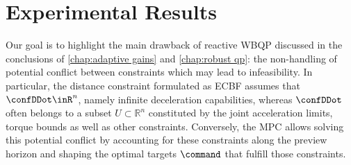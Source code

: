 \section{Experimental Results}\label{sec-chap5:experiments}
Our goal is to highlight the main drawback of reactive WBQP discussed in the conclusions of \cref{chap:adaptive gains} and \cref{chap:robust qp}: the non-handling of potential conflict between constraints which may lead to infeasibility. In particular, the distance constraint formulated as ECBF assumes that $\confDDot\inR^n$, namely infinite deceleration capabilities, whereas $\confDDot$  often belongs to a subset  $U\subset\mathbb{R}^n$ constituted by the joint acceleration limits, torque bounds as well as other constraints. Conversely, the MPC allows solving this potential conflict by accounting for these constraints along the preview horizon and shaping the optimal targets $\command$ that fulfill those constraints.  %

